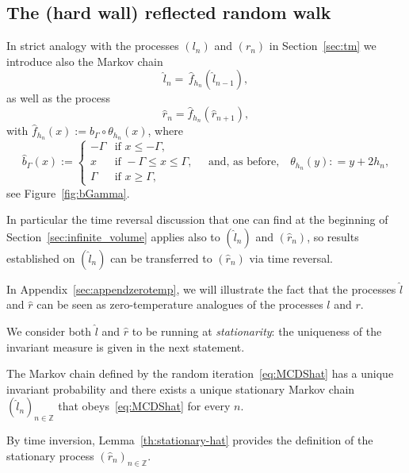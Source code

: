 \documentclass[AHL,Unicode,longabstracts,published]{cedram}
\newcommand{\bbZ}{\mathbb{Z}}
\newcommand{\gG}{\Gamma}
\newcommand{\ls}{\widehat{l}}
\newcommand{\rs}{\widehat{r}}
\begin{document}
\subsection{The (hard wall) reflected random walk}\label{sec:constrained}

In strict analogy with the processes $(l_n)$ and $(r_n)$ in Section~\ref{sec:tm} we introduce also the Markov chain
\begin{equation}\label{eq:MCDShat}
\ls_{n}= \, \widehat f_{h_{n}}(\ls_{n-1}),
\end{equation}
as well as the process
\begin{equation}
\rs_{n}= \widehat f_{h_{n}}\left(\rs_{n+1}\right),
\end{equation}
with $\widehat f_{h_{n}}(x) := \widehat b_\gG \circ \theta_{h_n}(x)$, where
\begin{equation}
\widehat b_\gG(x) :=
\begin{cases}
-\gG & \text{if } x\le -\gG,\\
x & \text{if } -\gG \le x \le \gG,\\
\gG & \text{if } x\ge \gG,
\end{cases}
\quad
\text{and, as before,}
\quad
\theta_{h_n}(y) : = y+ 2 h_n,
\end{equation}
see Figure~\ref{fig:bGamma}.

In particular the time reversal discussion that one can find at the beginning of Section~\ref{sec:infinite_volume} applies also to $(\ls_n)$ and $(\rs_n)$, so results established on $(\ls_n)$ can be transferred to $(\rs_n)$ via time reversal.


\begin{rema}
In Appendix~\ref{sec:appendzerotemp}, we will illustrate the fact that the processes $\ls$ and $\rs$ can be seen as zero-temperature analogues of the processes $l$ and $r$.
\end{rema}

We consider both $\ls$ and $\rs$ to be running at \emph{stationarity}: the uniqueness of the invariant measure is given in the next statement.

\begin{lemm}\label{th:stationary-hat}
The Markov chain defined by the random iteration~\eqref{eq:MCDShat} has a unique invariant probability and there exists a unique stationary Markov chain $(\ls_n)_{n \in \bbZ}$ that obeys~\eqref{eq:MCDShat} for every $n$.
\end{lemm}


By time inversion, Lemma~\ref{th:stationary-hat} provides the definition of the stationary process $(\rs_n)_{n \in \bbZ}$.
\end{document}
